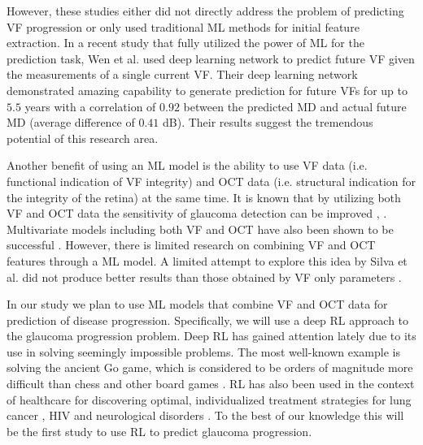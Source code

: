 However, these studies either did not directly address the problem of predicting \ac{VF} progression or only used traditional \ac{ML} methods for initial feature extraction. In a recent study that fully utilized the power of \ac{ML} for the prediction task, Wen et al. \cite{Wen2018} used deep learning network to predict future VF given the measurements of a single current \ac{VF}. Their deep learning network demonstrated amazing capability to generate prediction for future VFs for up to $5.5$ years with a correlation of $0.92$ between the predicted \ac{MD} and actual future \ac{MD} (average difference of $0.41$ dB). Their results suggest the tremendous potential of this research area. 

Another benefit of using an \ac{ML} model is the ability to use VF data (i.e. functional indication of \ac{VF} integrity) and \ac{OCT} data (i.e. structural indication for the integrity of the retina) at the same time. It is known that by utilizing both \ac{VF} and \ac{OCT} data the sensitivity of glaucoma detection can be improved \cite{Shah2006}, \cite{Lu2008}. Multivariate models including both \ac{VF} and \ac{OCT} have also been shown to be successful \cite{Mwanza2013}. However, there is limited research on combining \ac{VF} and \ac{OCT} features through a \ac{ML} model. A limited attempt to explore this idea by Silva et al. did not produce better results than those obtained by \ac{VF} only parameters \cite{Silva2013}. 

In our study we plan to use \ac{ML} models that combine \ac{VF} and \ac{OCT} data for prediction of disease progression.  Specifically, we will use a deep \ac{RL} approach to the glaucoma progression problem. Deep RL has gained attention lately due to its use in solving seemingly impossible problems. The most well-known example is solving the ancient Go game, which is considered to be orders of magnitude more difficult than chess and other board games \cite{Silver2016}. \ac{RL} has also been used in the context of healthcare for discovering optimal, individualized treatment strategies for lung cancer \cite{Zhao2009}\cite{Zhao2011}, HIV \cite{Ernst2006} and neurological disorders \cite{Shortreed2011}. To the best of our knowledge this will be the first study to use \ac{RL} to predict glaucoma progression. 

